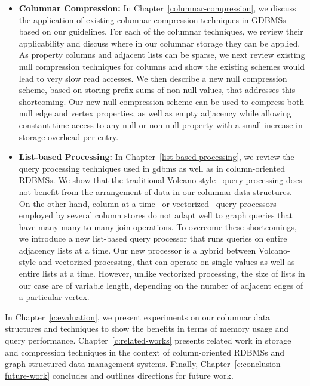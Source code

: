 \begin{itemize}
	\item \textbf{Columnar Compression:} In Chapter~\ref{columnar-compression}, we discuss the application of existing columnar compression techniques in GDBMSs based on our guidelines. For each of the columnar techniques, we review their applicability and discuss where in our columnar storage they can be applied. As property columns and adjacent lists can be sparse, we next review existing null compression techniques for columns and show the existing schemes would lead to very slow read accesses. We then describe a new null compression scheme, based on storing prefix sums of non-null values, that addresses this shortcoming. Our new null compression scheme can be used to compress both null edge and vertex properties, as well as empty adjacency while allowing constant-time access to any null or non-null property with a small increase in storage overhead per entry. 
	
	\item \textbf{List-based Processing:} In Chapter~\ref{list-based-processing}, we review the query processing techniques used in \gls{gdbms} as well as in column-oriented RDBMSs. We show that the traditional  Volcano-style~\cite{volcano} query processing does not benefit from the arrangement of data in our columnar data structures. On the other hand, column-at-a-time~\cite{col-vs-row} or vectorized~\cite{boncz-vectorwise1} query processors employed by several column stores do not adapt well to graph queries that have many many-to-many join operations. To overcome these shortcomings, we introduce a new list-based query processor that runs queries on entire adjacency lists at a time. Our new processor is a hybrid between Volcano-style and vectorized processing, that can operate on single values as well as entire lists at a time. However, unlike vectorized processing, the size of lists in our case are of variable length, depending on the number of adjacent edges of a particular vertex.
\end{itemize}

In Chapter~\ref{c:evaluation}, we present experiments on our columnar data structures and techniques to show the benefits in terms of memory usage and query performance. Chapter~\ref{c:related-works} presents related work in storage and compression techniques in the context of column-oriented RDBMSs and graph structured data management systems. Finally, Chapter~\ref{c:conclusion-future-work} concludes and outlines directions for future work.


